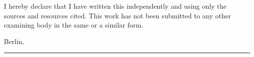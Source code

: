 
\pagebreak
{}

\vskip 1cm

I hereby declare that I have written this \thethesistyp{} independently and using only
the sources and resources cited. This work has not been submitted to any other
examining body in the same or a similar form.

\vskip 1cm

Berlin, \thedatum

\vskip 1.5cm

\noindent\rule{7cm}{0.4pt}\\[0.3ex]
\theautor
